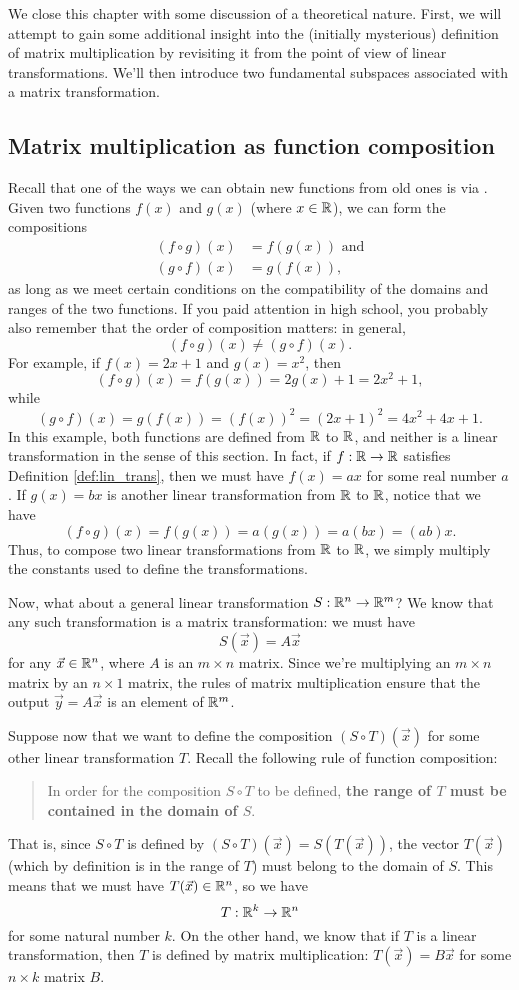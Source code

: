 We close this chapter with some discussion of a theoretical nature. First, we will attempt to gain some additional insight into the (initially mysterious) definition of matrix multiplication by revisiting it from the point of view of linear transformations. We'll then introduce two fundamental subspaces associated with a matrix transformation.

\subsection*{Matrix multiplication as function composition}
Recall that one of the ways we can obtain new functions from old ones is via . Given two functions $f(x)$ and $g(x)$ (where $x\in\mathbb{R}$), we can form the compositions
\begin{align*}
(f\circ g)(x) &= f(g(x)) \text{ and}\\
(g\circ f)(x) & = g(f(x)),
\end{align*}
as long as we meet certain conditions on the compatibility of the domains and ranges of the two functions. If you paid attention in high school, you probably also remember that the order of composition matters: in general,
\[
(f\circ g)(x) \neq (g\circ f)(x).
\]
For example, if $f(x) = 2x+1$ and $g(x) = x^2$, then
\[
(f\circ g)(x) = f(g(x)) = 2g(x)+1 = 2x^2+1,
\]
while
\[
(g\circ f)(x) = g(f(x)) = (f(x))^2 = (2x+1)^2 = 4x^2+4x+1.
\]
In this example, both functions are defined from $\mathbb{R}$ to $\mathbb{R}$, and neither is a linear transformation in the sense of this section. In fact, if $f:\mathbb{R}\to\mathbb{R}$ satisfies Definition \ref{def:lin_trans}, then we must have $f(x) = ax$ for some real number $a$. If $g(x) = bx$ is another linear transformation from $\mathbb{R}$ to $\mathbb{R}$, notice that we have
\[
(f\circ g)(x) = f(g(x))=a(g(x)) = a(bx) = (ab)x.
\]
Thus, to compose two linear transformations from $\mathbb{R}$ to $\mathbb{R}$, we simply multiply the constants used to define the transformations.

Now, what about a general linear transformation $S:\mathbb{R}^n\to \mathbb{R}^m$? We know that any such transformation is a matrix transformation: we must have
\[
S(\vec x) = A\vec x
\]
for any $\vec x\in\mathbb{R}^n$, where $A$ is an $m\times n$ matrix. Since we're multiplying an $m\times n$ matrix by an $n\times 1$ matrix, the rules of matrix multiplication ensure that the output $\vec y = A\vec x$ is an element of $\mathbb{R}^m$.

Suppose now that we want to define the composition $(S\circ T)(\vec x)$ for some other linear transformation $T$. Recall the following rule of function composition:
\begin{quote}
In order for the composition $S\circ T$ to be defined, \textbf{the range of $T$ must be contained in the domain of $S$}.
\end{quote}
That is, since $S\circ T$ is defined by $(S\circ T)(\vec x) = S(T(\vec x))$, the vector $T(\vec x)$ (which by definition is in the range of $T$) must belong to the domain of $S$. This means that we must have $T(\vec x)\in \mathbb{R}^n$, so we have
\[
T:\mathbb{R}^k\to \mathbb{R}^n
\]
for some natural number $k$. On the other hand, we know that if $T$ is a linear transformation, then $T$ is defined by matrix multiplication: $T(\vec x) = B\vec x$ for some $n\times k$ matrix $B$.


